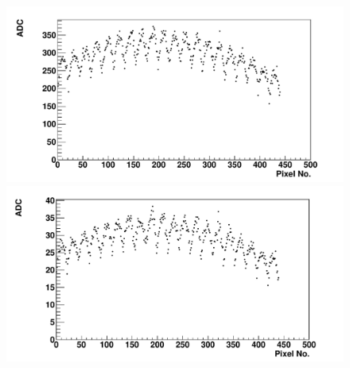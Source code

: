 \begin{figure} %
\includegraphics[width=\textwidth]{chapters/graphs/GainVarsMeas/LL_m04_2016-06-11/Set0and2/meanHist_StandHV_Pairs_set0and2.pdf}
\caption{}
\vspace{3mm}
\includegraphics[width=\textwidth]{chapters/graphs/GainVarsMeas/LL_m04_2016-06-11/Set0and2/meanHist_LowHV_Pairs_set0and2.pdf}
\caption{} \label{fig:CalAMeanADC_Pairs}
\end{figure}

